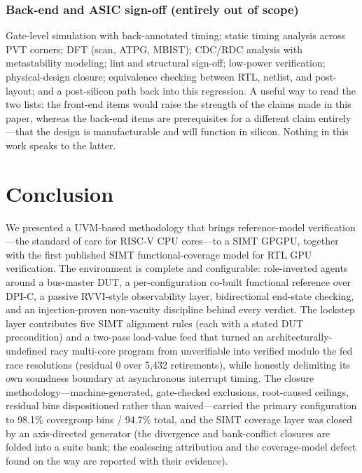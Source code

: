\documentclass[conference]{IEEEtran}
\begin{document}
\subsubsection{Back-end and ASIC sign-off (entirely out of scope)}
Gate-level simulation with back-annotated timing; static timing
analysis across PVT corners; DFT (scan, ATPG, MBIST); CDC/RDC analysis
with metastability modeling; lint and structural sign-off; low-power
verification; physical-design closure; equivalence checking between RTL,
netlist, and post-layout; and a post-silicon path back into this
regression. A useful way to read the two lists: the front-end items
would raise the strength of the claims made in this paper, whereas the
back-end items are prerequisites for a different claim entirely---that
the design is manufacturable and will function in silicon. Nothing in
this work speaks to the latter.

\section{Conclusion}
\label{sec:conclusion}
We presented a UVM-based methodology that brings reference-model
verification---the standard of care for RISC-V CPU cores---to a SIMT
GPGPU, together with the first published SIMT functional-coverage model
for RTL GPU verification. The environment is complete and configurable:
role-inverted agents around a bus-master DUT, a per-configuration
co-built functional reference over DPI-C, a passive RVVI-style
observability layer, bidirectional end-state checking, and an
injection-proven non-vacuity discipline behind every verdict. The
lockstep layer contributes five SIMT alignment rules (each with a
stated DUT precondition) and a
two-pass load-value feed that turned an architecturally-undefined racy
multi-core program from unverifiable into verified modulo the fed race
resolutions (residual
0 over 5{,}432 retirements), while honestly delimiting its own soundness
boundary at asynchronous interrupt timing. The closure
methodology---machine-generated, gate-checked exclusions, root-caused
ceilings, residual bins dispositioned rather than waived---carried the
primary configuration to 98.1\%
covergroup bins / 94.7\% total, and the SIMT coverage layer was closed by an axis-directed
generator (the divergence and bank-conflict closures are folded into a
suite bank; the coalescing attribution and the coverage-model defect
found on the way are reported with their evidence).
\end{document}
